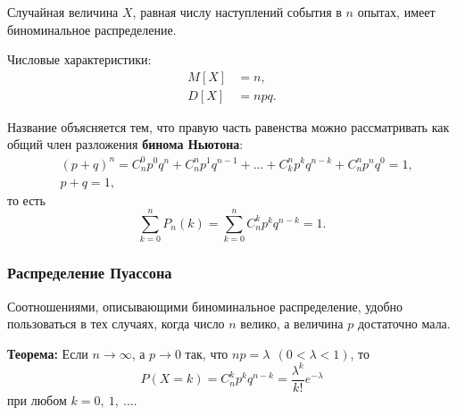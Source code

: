 \documentclass[a4paper]{article}
\newcommand{\key}[1]{{\color{Medium}\bfseries #1}}
\newcommand{\theorr}{{\color{Medium}\bfseries Теорема: \newline}}
\begin{document}
                Случайная величина $X$, равная числу наступлений события в $n$ опытах, имеет биноминальное распределение.
                
                Числовые характеристики:
                \begin{equation*}
                    \begin{aligned}
                        M[X] & = n , \\[1.0ex]
                        D[X] & = n p q .
                    \end{aligned}
                \end{equation*}
                
                Название объясняется тем, что правую часть равенства можно рассматривать как общий член разложения \key{бинома Ньютона}:
                \begin{equation*}
                    \begin{aligned}
                        & (p + q)^n = C_n^0 p^0 q^n + C_n^n p^1 q^{n - 1} + \ldots +
                            C_k^n p^k q^{n - k} + C_n^n p^n q^0 = 1 , \\[1.0ex]
                        & p + q = 1 ,
                    \end{aligned}
                \end{equation*}
                то есть
                \begin{equation*}
                    \sum\limits_{k = 0}^{n} P_n (k) =
                        \sum\limits_{k = 0}^{n} C_n^k p^k q^{n - k} = 1 .
                \end{equation*}

            \subsubsection{Распределение Пуассона}

                Соотношениями, описывающими биноминальное распределение, удобно пользоваться в тех случаях, когда число $n$ велико, а величина $p$ достаточно мала.

                \theorr
                Если $n \to \infty$, а $p \to 0$ так, что $n p = \lambda \:\: (0 < \lambda < 1)$, то
                \begin{equation*}
                    P(X = k) = C_n^k p^k q^{n - k} = \frac{\lambda^k}{k!} e^{-\lambda}
                \end{equation*}
                при любом $k = 0, \: 1, \: \ldots$.
\end{document}
